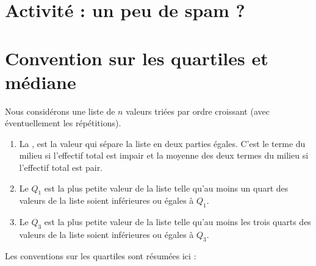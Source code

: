 



\setcounter{section}{-1}
\section{Activité : un peu de spam ?}



\section{Convention sur les quartiles et médiane}

\begin{definition}
    Nous considérons une liste de \( n\) valeurs triées par ordre croissant (avec éventuellement les répétitions).
    \begin{enumerate}
        \item
            La , est la valeur qui sépare la liste en deux parties égales. C'est le terme du milieu si l'effectif total est impair et la moyenne des deux termes du milieu si l'effectif total est pair.
      \item 
          Le  $Q_1$ est la plus petite valeur de la liste telle qu'au moins un quart des valeurs de la liste soient inférieures ou égales à $Q_1$.
        \item
            Le  $Q_3$ est la plus petite valeur de la liste telle qu'au moins les trois quarts des valeurs de la liste soient inférieures ou égales à $Q_3$.
  \end{enumerate}
\end{definition}
Les conventions sur les quartiles sont résumées ici :

